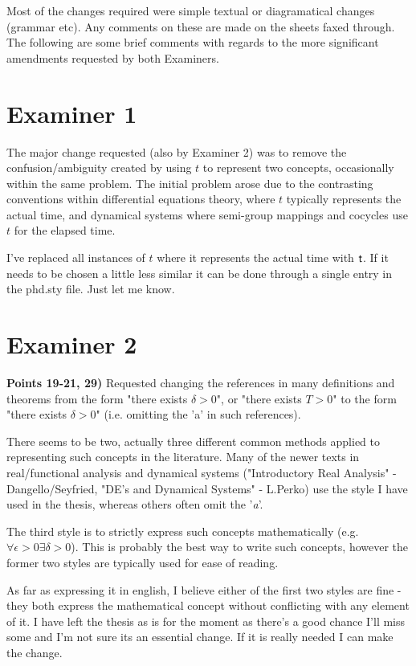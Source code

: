\documentclass[12pt]{book}
\begin{document}
\pagestyle{empty}{}{}

Most of the changes required were simple textual or diagramatical changes (grammar etc). Any comments on these are made on the sheets faxed through. The following are some brief comments with regards to the more significant amendments requested by both Examiners.

\section{Examiner 1}

The major change requested (also by Examiner 2) was to remove the confusion/ambiguity created by
using $t$ to represent two concepts, occasionally within the same problem. The initial problem arose due to the contrasting conventions within differential equations theory, where $t$ typically represents the actual time, and dynamical systems where semi-group mappings and cocycles use $t$ for the elapsed time. 

I've replaced all instances of $t$ where it represents the actual time with $ \mathsf{\mathsf{t}}$. If it needs to be chosen a little less similar it can be done through a single entry in the phd.sty file. Just let me know.

\section{Examiner 2}

\textbf{ Points 19-21, 29)} Requested changing the references in many definitions and theorems from the form "there exists  $\delta > 0$", or "there exists  $T > 0$" to the form "there exists $\delta > 0$" (i.e. omitting the 'a' in such references).

There seems to be two, actually three different common methods applied to representing such concepts in the literature. Many of the newer texts in real/functional analysis and dynamical systems ("Introductory Real Analysis" - Dangello/Seyfried, "DE's and Dynamical Systems" - L.Perko) use the style I have used in the thesis, whereas others often omit the '{\em a}'. 

The third style is to strictly express such concepts mathematically (e.g. $\forall \epsilon >0 \exists \delta > 0$). This is probably the best way to write such concepts, however the former two styles are typically used for ease of reading. 

As far as expressing it in english, I believe either of the first two styles are fine - they both express the mathematical concept without conflicting with any element of it.
I have left the thesis as is for the moment as there's a good chance I'll miss some and I'm not sure its an essential change. If it is really needed I can make the change. 
\end{document}
